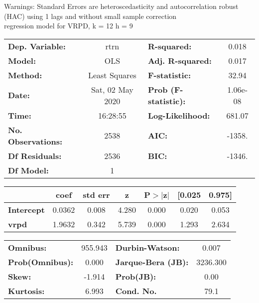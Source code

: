 Warnings: \newline
 [1] Standard Errors are heteroscedasticity and autocorrelation robust (HAC) using 1 lags and without small sample correction\\ 

regression model for VRPD, k = 12 h = 9\begin{center}
\begin{tabular}{lclc}
\toprule
\textbf{Dep. Variable:}    &       rtrn       & \textbf{  R-squared:         } &     0.018   \\
\textbf{Model:}            &       OLS        & \textbf{  Adj. R-squared:    } &     0.017   \\
\textbf{Method:}           &  Least Squares   & \textbf{  F-statistic:       } &     32.94   \\
\textbf{Date:}             & Sat, 02 May 2020 & \textbf{  Prob (F-statistic):} &  1.06e-08   \\
\textbf{Time:}             &     16:28:55     & \textbf{  Log-Likelihood:    } &    681.07   \\
\textbf{No. Observations:} &        2538      & \textbf{  AIC:               } &    -1358.   \\
\textbf{Df Residuals:}     &        2536      & \textbf{  BIC:               } &    -1346.   \\
\textbf{Df Model:}         &           1      & \textbf{                     } &             \\
\bottomrule
\end{tabular}
\begin{tabular}{lcccccc}
                   & \textbf{coef} & \textbf{std err} & \textbf{z} & \textbf{P$> |$z$|$} & \textbf{[0.025} & \textbf{0.975]}  \\
\midrule
\textbf{Intercept} &       0.0362  &        0.008     &     4.280  &         0.000        &        0.020    &        0.053     \\
\textbf{vrpd}      &       1.9632  &        0.342     &     5.739  &         0.000        &        1.293    &        2.634     \\
\bottomrule
\end{tabular}
\begin{tabular}{lclc}
\textbf{Omnibus:}       & 955.943 & \textbf{  Durbin-Watson:     } &    0.007  \\
\textbf{Prob(Omnibus):} &   0.000 & \textbf{  Jarque-Bera (JB):  } & 3236.300  \\
\textbf{Skew:}          &  -1.914 & \textbf{  Prob(JB):          } &     0.00  \\
\textbf{Kurtosis:}      &   6.993 & \textbf{  Cond. No.          } &     79.1  \\
\bottomrule
\end{tabular}
\end{center}

